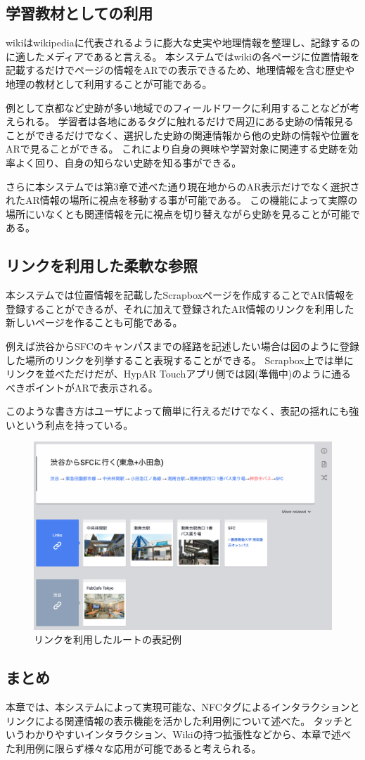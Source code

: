 \subsection{学習教材としての利用}
wikiはwikipediaに代表されるように膨大な史実や地理情報を整理し、記録するのに適したメディアであると言える。
本システムではwikiの各ページに位置情報を記載するだけでページの情報をARでの表示できるため、地理情報を含む歴史や地理の教材として利用することが可能である。

例として京都など史跡が多い地域でのフィールドワークに利用することなどが考えられる。
学習者は各地にあるタグに触れるだけで周辺にある史跡の情報見ることができるだけでなく、選択した史跡の関連情報から他の史跡の情報や位置をARで見ることができる。
これにより自身の興味や学習対象に関連する史跡を効率よく回り、自身の知らない史跡を知る事ができる。

さらに本システムでは第3章で述べた通り現在地からのAR表示だけでなく選択されたAR情報の場所に視点を移動する事が可能である。
この機能によって実際の場所にいなくとも関連情報を元に視点を切り替えながら史跡を見ることが可能である。



\subsection{リンクを利用した柔軟な参照}
\label{link_enum_notation}
本システムでは位置情報を記載したScrapboxページを作成することでAR情報を登録することができるが、それに加えて登録されたAR情報のリンクを利用した新しいページを作ることも可能である。

例えば渋谷からSFCのキャンパスまでの経路を記述したい場合は図のように登録した場所のリンクを列挙すること表現することができる。
Scrapbox上では単にリンクを並べただけだが、HypAR Touchアプリ側では図(準備中)のように通るべきポイントがARで表示される。


このような書き方はユーザによって簡単に行えるだけでなく、表記の揺れにも強いという利点を持っている。

\begin{figure}[h]
  \centering
  \includegraphics[width=150mm]{images/route_scrapbox.png}
  \caption{リンクを利用したルートの表記例} \label{fig:route_scrapbox}
\end{figure}


\subsection{まとめ}
本章では、本システムによって実現可能な、NFCタグによるインタラクションとリンクによる関連情報の表示機能を活かした利用例について述べた。
タッチというわかりやすいインタラクション、Wikiの持つ拡張性などから、本章で述べた利用例に限らず様々な応用が可能であると考えられる。
